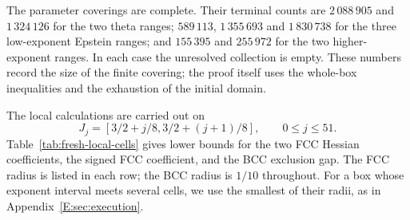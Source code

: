 \documentclass[reqno,english]{amsart}
\theoremstyle{definition}
\newtheorem{open problem}[theorem]{Open Problem}
\theoremstyle{remark}
\theoremstyle{plain}
\numberwithin{equation}{section}
\begin{document}
The parameter coverings are complete. Their terminal counts are
$2\,088\,905$ and $1\,324\,126$ for the two theta ranges;
$589\,113$, $1\,355\,693$ and $1\,830\,738$ for the three low-exponent
Epstein ranges; and $155\,395$ and $255\,972$ for the two higher-exponent
ranges. In each case the unresolved collection is empty. These numbers
record the size of the finite covering; the proof itself uses the
whole-box inequalities and the exhaustion of the initial domain.

The local calculations are carried out on
\[
 J_j=[3/2+j/8,3/2+(j+1)/8],\qquad 0\le j\le51.
\]
Table~\ref{tab:fresh-local-cells} gives lower bounds for the two
FCC Hessian coefficients, the signed FCC coefficient, and the BCC
exclusion gap. The FCC radius is listed in each row; the BCC radius
is $1/10$ throughout. For a box whose exponent interval meets several
cells, we use the smallest of their radii, as in
Appendix~\ref{E:sec:execution}.
\end{document}
